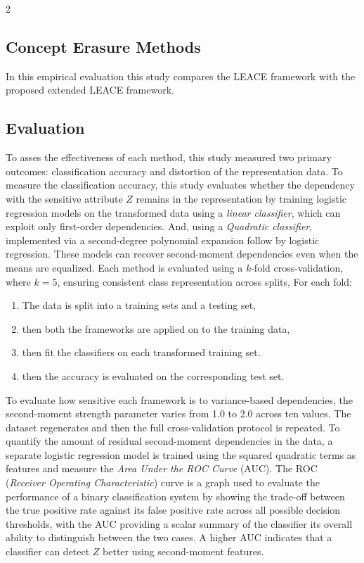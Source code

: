 \documentclass[ecta,nameyear,final]{econsocart}
\numberwithin{equation}{section}
\theoremstyle{plain}
\theoremstyle{definition}
\begin{document}
\begin{multicols}{2}
\subsection{Concept Erasure Methods}
In this empirical evaluation this study compares the LEACE framework with the proposed extended LEACE framework.

\subsection{Evaluation}
To asses the effectiveness of each method, this study measured two primary outcomes: classification accuracy and distortion of the representation data.
\newline \newline
To measure the classification accuracy, this study evaluates whether the dependency with the sensitive attribute $Z$ remains in the representation by training logistic regression models on the transformed data using a \emph{linear classifier}, which can exploit only first-order dependencies. And, using a \emph{Quadratic classifier}, implemented via a second-degree polynomial expansion follow by logistic regression. These models can recover second-moment dependencies even when the means are equalized.
\newline \newline
Each method is evaluated using a $k$-fold cross-validation, where $k=5$, ensuring consistent class representation across splits, For each fold:
\begin{enumerate}
    \item The data is split into a training sets and a testing set,
    \item then both the frameworks are applied on to the training data,
    \item then fit the classifiers on each transformed training set.
    \item then the accuracy is evaluated on the corresponding test set.
\end{enumerate}
To evaluate how sensitive each framework is to variance-based dependencies, the second-moment strength parameter varies from 1.0 to 2.0 across ten values. The dataset regenerates and then the full cross-validation protocol is repeated.
\newline \newline
To quantify the amount of residual second-moment dependencies in the data, a separate logistic regression model is trained using the squared quadratic terms as features and measure the \emph{Area Under the ROC Curve} (AUC). The ROC (\emph{Receiver Operating Characteristic}) curve is a graph used to evaluate the performance of a binary classification system by showing the trade-off between the true positive rate against its false positive rate across all possible decision thresholds, with the AUC providing a scalar summary of the classifier its overall ability to distinguish between the two cases. A higher AUC indicates that a classifier can detect $Z$ better using second-moment features.

\end{multicols}
\end{document}
